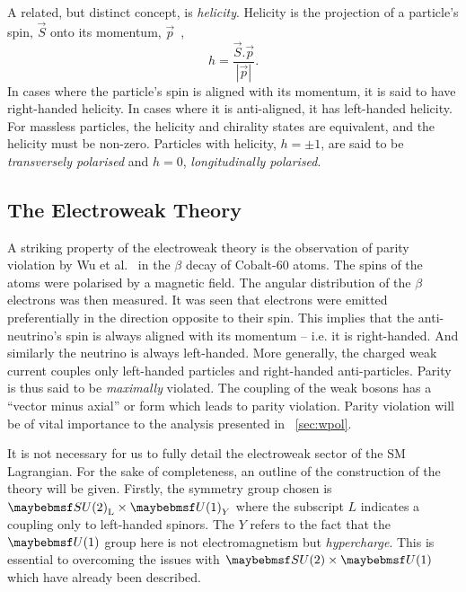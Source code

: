A related, but distinct concept, is \emph{helicity}. Helicity is the projection
of a particle's spin, $\vec{S}$ onto its momentum, $\vec{p}$~\cite{peskin_schroeder},
\begin{equation*}
h = \frac{\vec{S}.\vec{p}}{\left|\vec{p}\right|}.
\end{equation*}
In cases where the particle's spin is aligned with its momentum, it is said to
have right-handed helicity. In cases where it is anti-aligned, it has
left-handed helicity. For massless particles, the helicity and chirality states
are equivalent, and the helicity must be non-zero. Particles with helicity,
$h=\pm 1$, are said to be \emph{transversely polarised} and $h=0$,
\emph{longitudinally polarised}.

\subsection{The Electroweak Theory}\label{sec:sm_electroweak}
A striking property of the electroweak theory is the observation of parity
violation by Wu et al.~\cite{wu_parity} in the $\beta$ decay of Cobalt-60
atoms. The spins of the atoms were polarised by a magnetic field. The angular
distribution of the $\beta$ electrons was then measured. It was seen that
electrons were emitted preferentially in the direction opposite to their
spin. This implies that the anti-neutrino's spin is always aligned with its
momentum -- i.e. it is right-handed. And similarly the neutrino is always
left-handed. More generally, the charged weak current couples only left-handed
particles and right-handed anti-particles. Parity is thus said to be
\emph{maximally} violated. The coupling of the weak bosons has a ``vector minus
axial'' or \VminusA form which leads to parity violation. Parity violation will
be of vital importance to the analysis presented in \chap~\ref{sec:wpol}.

It is not necessary for us to fully detail the electroweak sector of the \ac{SM}
Lagrangian. For the sake of completeness, an outline of the construction of the
theory will be given. Firstly, the symmetry group chosen is
$\SUtwo_{\textrm{L}}\times \Uone_{Y}$ where the subscript $L$ indicates a
coupling only to left-handed spinors. The $Y$ refers to the fact that the
$\Uone$ group here is not electromagnetism but \emph{hypercharge}. This is
essential to overcoming the issues with $\SUtwo\times\Uone$ which have already
been described.

